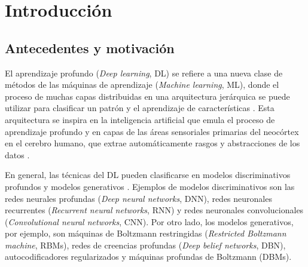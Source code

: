 \chapter{Introducción}
\section{Antecedentes y motivación}
El aprendizaje profundo ({\em Deep learning}, DL) se refiere a una nueva clase de métodos de las máquinas de aprendizaje ({\em Machine learning}, ML), donde el proceso de muchas capas distribuidas en una arquitectura jerárquica se puede utilizar para clasificar un patrón y el aprendizaje de características \cite{Hinton2006, Bengio2009}. Esta arquitectura se inspira en la inteligencia artificial que emula el proceso de aprendizaje profundo y en capas de las áreas sensoriales primarias del neocórtex en el cerebro humano, que extrae automáticamente rasgos y abstracciones de los datos \cite{Bengio2007, Bengio2013, Arel2010}.

En general, las técnicas del DL pueden clasificarse en modelos discriminativos profundos y modelos generativos \cite{Deng2014}. Ejemplos de modelos discriminativos son las redes neurales profundas ({\em Deep neural networks}, DNN), redes neuronales recurrentes ({\em Recurrent neural networks}, RNN) y redes neuronales convolucionales ({\em Convolutional neural networks}, CNN). Por otro lado, los modelos generativos, por ejemplo, son máquinas de Boltzmann restringidas ({\em Restricted Boltzmann machine}, RBMs), redes de creencias profundas ({\em Deep belief networks}, DBN), autocodificadores regularizados y máquinas profundas de Boltzmann (DBMs).

